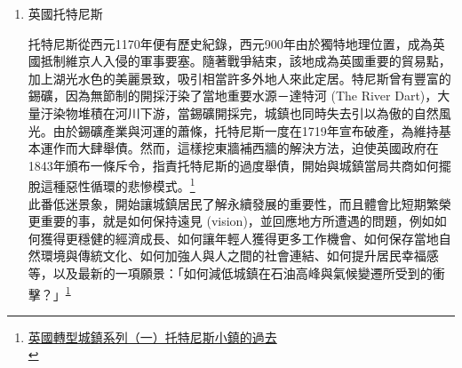 \documentclass[a4paper,12pt]{article}
\begin{document}
\begin{enumerate}
\item 英國托特尼斯
\label{sec:orge439b63}

托特尼斯從西元1170年便有歷史紀錄，西元900年由於獨特地理位置，成為英國抵制維京人入侵的軍事要塞。隨著戰爭結束，該地成為英國重要的貿易點，加上湖光水色的美麗景致，吸引相當許多外地人來此定居。特尼斯曾有豐富的錫礦，因為無節制的開採汙染了當地重要水源－達特河 (The River Dart)，大量汙染物堆積在河川下游，當錫礦開採完，城鎮也同時失去引以為傲的自然風光。由於錫礦產業與河運的蕭條，托特尼斯一度在1719年宣布破產，為維持基本運作而大肆舉債。然而，這樣挖東牆補西牆的解決方法，迫使英國政府在1843年頒布一條斥令，指責托特尼斯的過度舉債，開始與城鎮當局共商如何擺脫這種惡性循環的悲慘模式。\footnote{\href{https://lowestc.blogspot.com/2016/12/blog-post\_8.html}{英國轉型城鎮系列（一）托特尼斯小鎮的過去 }\\\label{org656e0b4}}\\

此番低迷景象，開始讓城鎮居民了解永續發展的重要性，而且體會比短期繁榮更重要的事，就是如何保持遠見 (vision)，並回應地方所遭遇的問題，例如如何獲得更穩健的經濟成長、如何讓年輕人獲得更多工作機會、如何保存當地自然環境與傳統文化、如何加強人與人之間的社會連結、如何提升居民幸福感等，以及最新的一項願景：「如何減低城鎮在石油高峰與氣候變遷所受到的衝擊？」\textsuperscript{\ref{org656e0b4}}\\


\end{enumerate}
\end{document}
